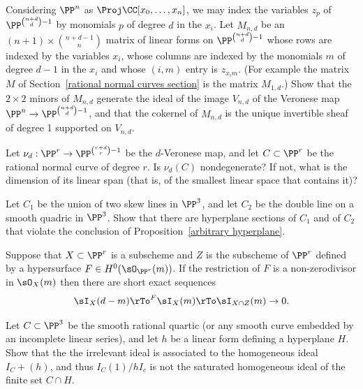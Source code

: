 \begin{exercise}\label{equations of Veroneses}
Considering $\PP^n$ as $\Proj \CC[x_0,\dots,x_n]$, we may index the variables $z_p$ of $\PP^{\binom{n+d}{d}-1}$ by  monomials $p$
of degree $d$ in the $x_i$. Let $M_{n,d}$ be an $(n+1)\times \binom{n+d-1}{n}$ matrix of linear forms
on $\PP^{\binom{n+d}{d}-1}$ whose rows are indexed by the variables $x_i$, whose columns are indexed by the monomials $m$ of degree $d-1$ in the $x_i$ and
whose $(i,m)$ entry is $z_{x_im}$. (For example the matrix
$M$ of Section~\ref{rational normal curves section} is the matrix $M_{1,d}$.) Show that the $2\times 2$ minors of $M_{n,d}$ generate the ideal of the image $V_{n,d}$ of the Veronese map 
$\PP^n\to \PP^{\binom{n+d}{d}-1}$, and that the cokernel of $M_{n,d}$ is the unique invertible sheaf of degree 1 supported on $V_{n,d}$.
\end{exercise}

\begin{exercise}
 Let $\nu_d: \PP^r \to \PP^{\binom{r+d}{r}-1}$ be the $d$-Veronese map, and let $C\subset \PP^r$ be the rational normal curve of degree $r$. Is $\nu_d(C)$ nondegenerate? If not, what is the dimension of its linear span (that is, of the smallest linear
 space that contains it)?
\end{exercise}

\begin{exercise}\label{arbitrary hyperplane examples}
Let $C_1$ be the union of two skew lines in $\PP^3$, and let $C_2$ be the double line on a smooth quadric in $\PP^3$.
Show that there are hyperplane sections of $C_1$ and of $C_2$ that violate the conclusion of Proposition~\ref{arbitrary hyperplane}.
\end{exercise}

\begin{exercise}\label{restriction of ideals}
Suppose that $X\subset \PP^r$ is a subscheme and  $Z$ is the subscheme of $\PP^r$ defined by a hypersurface $F\in H^0(\sO_{\PP^r}(m))$. If the restriction of $F$ is a non-zerodivisor in 
$\sO_X(m)$  then there are short exact sequences
$$
\sI_X(d-m) \rTo^F \sI_X(m) \rTo \sI_{X\cap Z}(m) \to 0.
$$
\end{exercise}

\begin{exercise}\label{bad restriction}
Let $C\subset \PP^3$ be the smooth rational quartic (or any smooth curve embedded by an incomplete linear series), and let $h$ be a linear form defining a hyperplane $H$.
Show that
the the irrelevant ideal is associated to the 
homogeneous ideal $I_C+(h)$, and thus $I_C(1)/hI_c$ is not the saturated homogeneous ideal of the finite
set $C\cap H$. 
\end{exercise}

